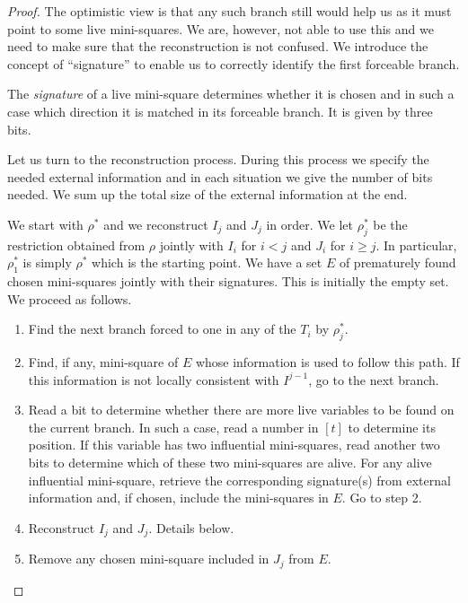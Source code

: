 \documentclass{theoretics}
\begin{document}
\begin{proof}
The optimistic view is that any such branch still would help
us as it must point to some live mini-squares.  We are,
however, not able to use this and we need to
make sure that the reconstruction is not confused.
We introduce the concept of ``signature'' to enable
us to correctly identify the first forceable branch.

\begin{definition}
The {\em signature} of a live mini-square determines whether
it is chosen and in such a case which direction
it is matched in its forceable branch.  It is given by
three bits.
\end{definition}

Let us turn to the reconstruction process. 
During this process we specify the needed external information
and in each situation we give the number of bits needed.
We sum up the total size of the external information
at the end.

We start with $\rho^*$ and we reconstruct
$I_j$ and $J_j$ in order.  We let $\rho_j^*$ be
the restriction obtained from $\rho$ jointly
with $I_i$ for $i < j$ and $J_i$ for $i \geq j$.
In particular, $\rho^*_1$ is simply $\rho^*$ which
is the starting point.
We have a set $E$ of prematurely found chosen mini-squares
jointly with their signatures.  This is initially the
empty set.  We proceed as follows.

\begin{enumerate}

\item Find the next branch forced to one in any
of the $T_i$ by $\rho_j^*$.

\item Find, if any, mini-square of $E$ whose information
is used to follow this path.  If this information is
not locally consistent with $I^{j-1}$, go
to the next branch.

\item Read a bit to determine whether there are more
live variables to be found on the current branch.
In such a case, read a number in $[t]$ to
determine its position.  If this variable has two
influential mini-squares, read another two bits
to determine which of these two mini-squares are alive.
For any alive influential mini-square, retrieve the corresponding 
signature(s) from external information
and, if chosen, include the mini-squares in $E$.
Go to step 2.

\item Reconstruct $I_j$ and $J_j$.  Details below.

\item Remove any chosen mini-square included in $J_j$ from $E$.


\end{enumerate}
\end{proof}
\end{document}
